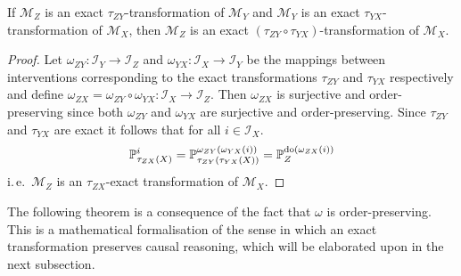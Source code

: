 \medskip

\begin{lemma}\label{theorem:transitivity}
    If $\mathcal{M}_Z$ is an exact $\tau_{ZY}$-transformation of $\mathcal{M}_Y$ and $\mathcal{M}_Y$ is an exact $\tau_{YX}$-transformation of $\mathcal{M}_X$, then $\mathcal{M}_Z$ is an exact $(\tau_{ZY}\circ\tau_{YX})$-transformation of $\mathcal{M}_X$.
\end{lemma}

\begin{proof}
    Let $\omega_{ZY}:\mathcal{I}_Y \to \mathcal{I}_Z$ and $\omega_{YX}:\mathcal{I}_X \to \mathcal{I}_Y$ be the mappings between interventions corresponding to the exact transformations $\tau_{ZY}$ and $\tau_{YX}$ respectively and define $\omega_{ZX} = \omega_{ZY}\circ\omega_{YX}:\mathcal{I}_X \to \mathcal{I}_Z$.
    Then $\omega_{ZX}$ is surjective and order-preserving since both $\omega_{ZY}$ and $\omega_{YX}$ are surjective and order-preserving.
    Since $\tau_{ZY}$ and $\tau_{YX}$ are exact it follows that for all $i\in\mathcal{I}_X$. 
    \begin{align*}
        \mathbb{P}^{i}_{\tau_{ZX}(X)}
        =
        \mathbb{P}^{ \omega_{ZY}(\omega_{YX}(i))}_{\tau_{ZY}(\tau_{YX}(X))}
        =
        \mathbb{P}^{\operatorname{do}(\omega_{ZX}(i))}_{Z}
    \end{align*}
    i.\,e.\ $\mathcal{M}_Z$ is an $\tau_{ZX}$-exact transformation of $\mathcal{M}_X$.
\end{proof}

The following theorem is a consequence of the fact that $\omega$ is order-preserving. This is a mathematical formalisation of the sense in which an exact transformation preserves causal reasoning, which will be elaborated upon in the next subsection.

\medskip


